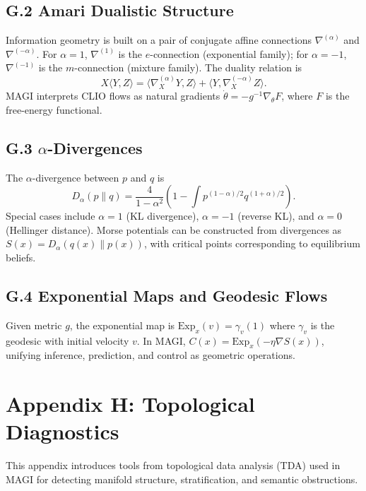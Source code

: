 \documentclass[11pt,a4paper,twocolumn]{article}
\begin{document}
\subsection*{G.2 Amari Dualistic Structure}

Information geometry is built on a pair of conjugate affine connections
$\nabla^{(\alpha)}$ and $\nabla^{(-\alpha)}$. For $\alpha = 1$,
$\nabla^{(1)}$ is the $e$-connection (exponential family); for
$\alpha = -1$, $\nabla^{(-1)}$ is the $m$-connection (mixture family).
The duality relation is
\[
X\langle Y,Z\rangle =
\langle \nabla^{(\alpha)}_X Y, Z\rangle
+
\langle Y, \nabla^{(-\alpha)}_X Z\rangle.
\]
MAGI interprets CLIO flows as natural gradients $\dot{\theta} = -g^{-1}
\nabla_\theta F$, where $F$ is the free-energy functional.

\subsection*{G.3 $\alpha$-Divergences}

The $\alpha$-divergence between $p$ and $q$ is
\[
D_\alpha(p\|q) =
\frac{4}{1-\alpha^2}
\left(
1 - \int p^{(1-\alpha)/2} q^{(1+\alpha)/2}
\right).
\]
Special cases include $\alpha = 1$ (KL divergence), $\alpha = -1$
(reverse KL), and $\alpha = 0$ (Hellinger distance). Morse potentials
can be constructed from divergences as $S(x) = D_\alpha(q(x)\|p(x))$,
with critical points corresponding to equilibrium beliefs.

\subsection*{G.4 Exponential Maps and Geodesic Flows}

Given metric $g$, the exponential map is $\mathrm{Exp}_x(v) =
\gamma_v(1)$ where $\gamma_v$ is the geodesic with initial velocity $v$.
In MAGI, $C(x) = \mathrm{Exp}_x(-\eta \nabla S(x))$, unifying
inference, prediction, and control as geometric operations.


\section*{Appendix H: Topological Diagnostics}

This appendix introduces tools from topological data analysis (TDA)
used in MAGI for detecting manifold structure, stratification, and
semantic obstructions.
\end{document}
